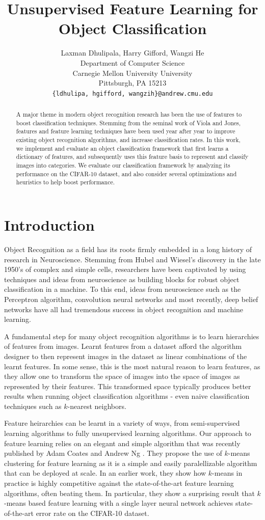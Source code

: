 \documentclass{article} %
\title{Unsupervised Feature Learning for Object Classification}
\author{
  Laxman Dhulipala, Harry Gifford, Wangzi He \\
  Department of Computer Science\\
  Carnegie Mellon University University\\
  Pittsburgh, PA 15213 \\
  \texttt{\{ldhulipa, hgifford, wangzih\}@andrew.cmu.edu} \\
}
\begin{document}
\maketitle

\begin{abstract}
  A major theme in modern object recognition research has been the use of
  features to boost classification techniques. Stemming from the seminal work
  of Viola and Jones, features and feature learning techniques have been used
  year after year to improve existing object recognition algorithms, and increase
  classification rates. In this work, we implement and evaluate an object classification framework
  that first learns a dictionary of features, and subsequently uses this feature basis
  to represent and classify images into categories. We evaluate our classification framework
  by analyzing its performance on the CIFAR-10 dataset, and also consider several optimizations
  and heuristics to help boost performance.
\end{abstract}

\section{Introduction}

Object Recognition as a field has its roots firmly embedded in a long history
of research in Neuroscience. Stemming from Hubel and Wiesel's discovery in the
late 1950's of complex and simple cells, researchers have been captivated by using
techniques and ideas from neuroscience as building blocks for robust object
classification in a machine\cite{hubel}. To this end, ideas from neuroscience such as the Perceptron
algorithm, convolution neural networks and most recently, deep belief networks have all
had tremendous success in object recognition and machine learning.

A fundamental step for many object recognition algorithms is to learn hierarchies
of features from images. Learnt features from a dataset afford the algorithm designer
to then represent images in the dataset as linear combinations of the learnt features.
In some sense, this is the most natural reason to learn features, as they allow one
to transform the space of images into the space of images as represented by their features.
This transformed space typically produces better results when running object classification
algorithms - even naive classification techniques such as $k$-nearest neighbors.

Feature heirarchies can be learnt in a variety of ways, from semi-supervised learning
algorithms to fully unsupervised learning algorithms.
Our approach to feature learning relies on an elegant and simple algorithm that was
recently published by Adam Coates and Andrew Ng \cite{coates11}. They propose the use
of $k$-means clustering for feature learning as it is a simple and easily paralellizable
algorithm that can be deployed at scale. In an earlier work, they show how $k$-means in
practice is highly competitive against the state-of-the-art feature learning algorithms,
often beating them. In particular, they show a surprising result that
$k$-means based feature learning with a single layer neural network achieves state-of-the-art
error rate on the CIFAR-10 dataset.
\end{document}

